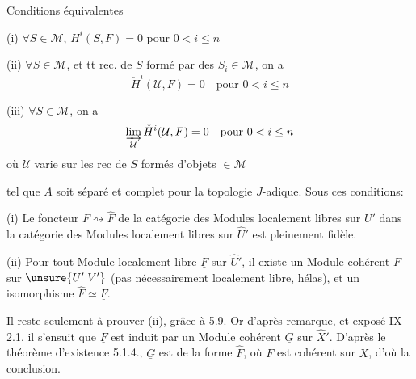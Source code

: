 
Conditions équivalentes

(i) $\forall S\in\mathcal M$, $H^i(S,F)=0$ pour $0<i\leq n$

(ii) $\forall S\in\mathcal M$,  et tt rec. de $S$
formé par des $S_i\in\mathcal M$, on a
\[
\check H^i(\mathcal U,F)=0\quad\text{pour }0<i\leq n
\]

(iii) $\forall S\in\mathcal M$, on a
\[
\varinjlim_{\mathcal U}\check H^i(\mathcal U,F)=0\quad\text{pour }0<i\leq n
\]
où $\mathcal U$ varie sur les rec de $S$ formés
d'objets $\in\mathcal M$

tel que $A$ soit séparé et complet pour la topologie $J$-adique. Sous ces conditions:

(i) Le foncteur $F\rightsquigarrow\widehat F$ de la catégorie des Modules localement libres
sur $U'$ dans la catégorie des Modules localement libres sur $\widehat U'$ est
pleinement fidèle.

(ii) Pour tout Module localement libre $\underline F$ sur $\widehat U'$, il existe un Module
cohérent $F$ sur $\unsure{U'|V'}$ (pas nécessairement localement libre, hélas), et un
isomorphisme $\widehat F\simeq\underline F$.

Il reste seulement à prouver (ii), grâce à 5.9. Or d'après 
remarque, et exposé IX 2.1. il s'ensuit que $\underline F$ est induit par un Module
cohérent $\underline G$ sur $\widehat X'$. D'après le théorème  d'existence
5.1.4., $\underline G$ est de la forme $\widehat F$, où $F$ est cohérent sur $X$, d'où la conclusion.

